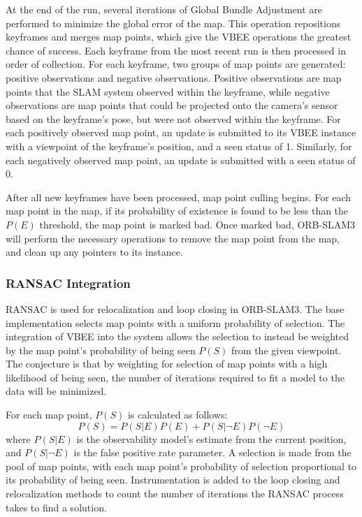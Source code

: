 At the end of the run, several iterations of Global Bundle Adjustment are performed to minimize the global error of the map. This operation repositions keyframes and merges map points, which give the VBEE operations the greatest chance of success. Each keyframe from the most recent run is then processed in order of collection. For each keyframe, two groups of map points are generated: positive observations and negative observations. Positive observations are map points that the SLAM system observed within the keyframe, while negative observations are map points that could be projected onto the camera's sensor based on the keyframe's pose, but were not observed within the keyframe. For each positively observed map point, an update is submitted to its VBEE instance with a viewpoint of the keyframe's position, and a seen status of 1. Similarly, for each negatively observed map point, an update is submitted with a seen status of 0.

After all new keyframes have been processed, map point culling begins. For each map point in the map, if its probability of existence is found to be less than the $P(E)$ threshold, the map point is marked bad. Once marked bad, ORB-SLAM3 will perform the necessary operations to remove the map point from the map, and clean up any pointers to its instance.

\subsubsection{RANSAC Integration}

RANSAC is used for relocalization and loop closing in ORB-SLAM3. The base implementation selects map points with a uniform probability of selection. The integration of VBEE into the system allows the selection to instead be weighted by the map point's probability of being seen $P(S)$ from the given viewpoint. The conjecture is that by weighting for selection of map points with a high likelihood of being seen, the number of iterations required to fit a model to the data will be minimized.

For each map point, $P(S)$ is calculated as follows:
$$
P(S)=P(S|E)P(E)+P(S|\neg E)P(\neg E)
$$
where $P(S|E)$ is the observability model's estimate from the current position, and $P(S|\neg E)$ is the false positive rate parameter. A selection is made from the pool of map points, with each map point's probability of selection proportional to its probability of being seen. Instrumentation is added to the loop closing and relocalization methods to count the number of iterations the RANSAC process takes to find a solution. 